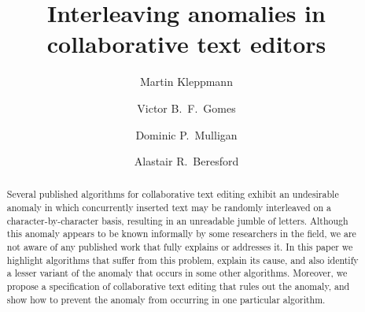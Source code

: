 \documentclass[sigconf]{acmart}
\begin{document}
\title{Interleaving anomalies in collaborative text editors}

\author{Martin Kleppmann}

\author{Victor B.\ F.\ Gomes}

\author{Dominic P.\ Mulligan}

\author{Alastair R.\ Beresford}

\begin{abstract}
Several published algorithms for collaborative text editing exhibit an undesirable anomaly in which concurrently inserted text may be randomly interleaved on a character-by-character basis, resulting in an unreadable jumble of letters.
Although this anomaly appears to be known informally by some researchers in the field, we are not aware of any published work that fully explains or addresses it.
In this paper we highlight algorithms that suffer from this problem, explain its cause, and also identify a lesser variant of the anomaly that occurs in some other algorithms.
Moreover, we propose a specification of collaborative text editing that rules out the anomaly, and show how to prevent the anomaly from occurring in one particular algorithm.
\end{abstract}
\end{document}
